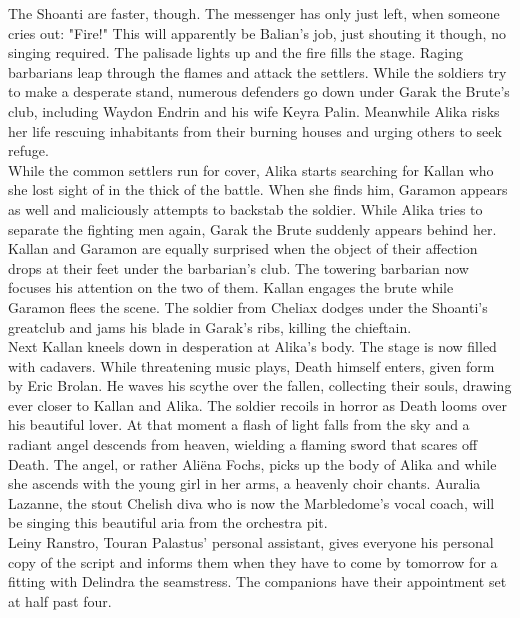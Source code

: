 The Shoanti are faster, though. The messenger has only just left, when someone cries out: "Fire!" This will apparently be Balian's job, just shouting it though, no singing required. The palisade lights up and the fire fills the stage. Raging barbarians leap through the flames and attack the settlers. While the soldiers try to make a desperate stand, numerous defenders go down under Garak the Brute's club, including Waydon Endrin and his wife Keyra Palin. Meanwhile Alika risks her life rescuing inhabitants from their burning houses and urging others to seek refuge.\\

While the common settlers run for cover, Alika starts searching for Kallan who she lost sight of in the thick of the battle. When she finds him, Garamon appears as well and maliciously attempts to backstab the soldier. While Alika tries to separate the fighting men again, Garak the Brute suddenly appears behind her. Kallan and Garamon are equally surprised when the object of their affection drops at their feet under the barbarian's club. The towering barbarian now focuses his attention on the two of them. Kallan engages the brute while Garamon flees the scene. The soldier from Cheliax dodges under the Shoanti's greatclub and jams his blade in Garak's ribs, killing the chieftain.\\

Next Kallan kneels down in desperation at Alika's body. The stage is now filled with cadavers. While threatening music plays, Death himself enters, given form by Eric Brolan. He waves his scythe over the fallen, collecting their souls, drawing ever closer to Kallan and Alika. The soldier recoils in horror as Death looms over his beautiful lover. At that moment a flash of light falls from the sky and a radiant angel descends from heaven, wielding a flaming sword that scares off Death. The angel, or rather Ali\"ena Fochs, picks up the body of Alika and while she ascends with the young girl in her arms, a heavenly choir chants. Auralia Lazanne, the stout Chelish diva who is now the Marbledome's vocal coach, will be singing this beautiful aria from the orchestra pit.\\

Leiny Ranstro, Touran Palastus' personal assistant, gives everyone his personal copy of the script and informs them when they have to come by tomorrow for a fitting with Delindra the seamstress. The companions have their appointment set at half past four.\\

